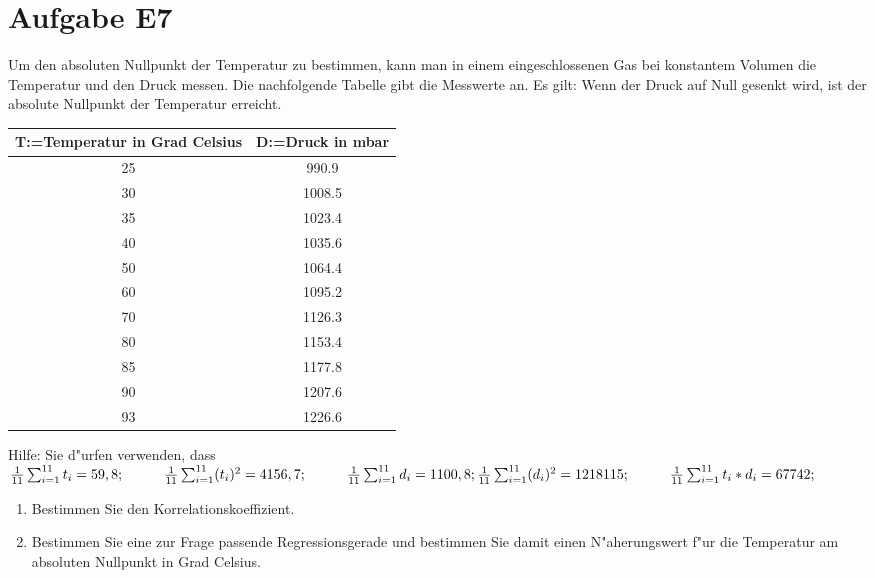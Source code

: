 \section{Aufgabe E7}
Um den absoluten Nullpunkt der Temperatur zu bestimmen, kann man in einem eingeschlossenen Gas bei
konstantem Volumen die Temperatur und den Druck messen. Die nachfolgende Tabelle gibt die Messwerte
an. Es gilt: Wenn der Druck auf Null gesenkt wird, ist der absolute Nullpunkt der Temperatur erreicht.
\newline

\begin{center}
\begin{tabular}{|c|c|}
\hline  T:=Temperatur in Grad Celsius&  D:=Druck in mbar	\\ 
\hline  			25&						990.9		  	\\ 
\hline  			30&  					1008.5			\\ 
\hline  			35&  					1023.4			\\ 
\hline  			40&  					1035.6			\\ 
\hline  			50&  					1064.4			\\ 
\hline  			60&  					1095.2			\\ 
\hline  			70&  					1126.3			\\ 
\hline  			80&  					1153.4			\\ 
\hline  			85&  					1177.8			\\ 
\hline  			90&  					1207.6			\\ 
\hline  			93&  					1226.6			\\ 
\hline 
\end{tabular} 
\end{center}
Hilfe: Sie d"urfen verwenden, dass
\newline
\newline
$	\frac{1}{11}\sum _{i=1}^{11}{t}_{i}=59,8; 
	\hspace{1cm}
	\frac{1}{11}\sum _{i=1}^{11}({t}_{i})^2=4156,7;
	\hspace{1cm} 
	\frac{1}{11}\sum _{i=1}^{11}{d}_{i}=1100,8; 
	\newline
	\newline
	\frac{1}{11}\sum _{i=1}^{11}({d}_{i})^2=1218115; 
	\hspace{1cm}
	\frac{1}{11}\sum _{i=1}^{11}{t}_{i}*{d}_{i}=67742; 
$

\begin{enumerate}[leftmargin=1cm, label=\alph*)]
\item Bestimmen Sie den Korrelationskoeffizient.
\vspace{5cm}

\item Bestimmen Sie eine zur Frage passende Regressionsgerade und bestimmen Sie damit einen N"aherungswert f"ur die Temperatur am absoluten Nullpunkt in Grad Celsius.
\end{enumerate}

